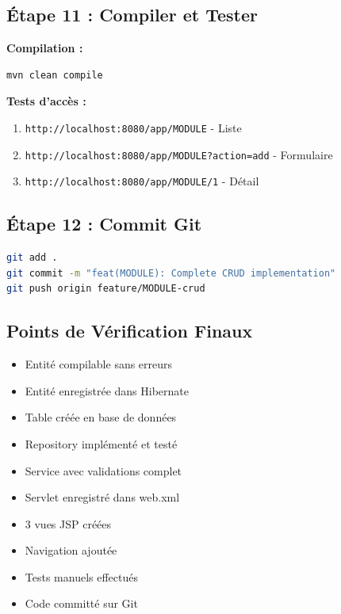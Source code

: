 \documentclass[12pt,a4paper]{article}
\begin{document}
\subsection{Étape 11 : Compiler et Tester}

\textbf{Compilation :}
\begin{lstlisting}[language=bash]
mvn clean compile
\end{lstlisting}

\textbf{Tests d'accès :}
\begin{enumerate}
    \item \texttt{http://localhost:8080/app/MODULE} - Liste
    \item \texttt{http://localhost:8080/app/MODULE?action=add} - Formulaire
    \item \texttt{http://localhost:8080/app/MODULE/1} - Détail
\end{enumerate}

\subsection{Étape 12 : Commit Git}

\begin{lstlisting}[language=bash]
git add .
git commit -m "feat(MODULE): Complete CRUD implementation"
git push origin feature/MODULE-crud
\end{lstlisting}

\subsection{Points de Vérification Finaux}

\begin{itemize}
    \item[$\square$] Entité compilable sans erreurs
    \item[$\square$] Entité enregistrée dans Hibernate
    \item[$\square$] Table créée en base de données
    \item[$\square$] Repository implémenté et testé
    \item[$\square$] Service avec validations complet
    \item[$\square$] Servlet enregistré dans web.xml
    \item[$\square$] 3 vues JSP créées
    \item[$\square$] Navigation ajoutée
    \item[$\square$] Tests manuels effectués
    \item[$\square$] Code committé sur Git
\end{itemize}
\end{document}

